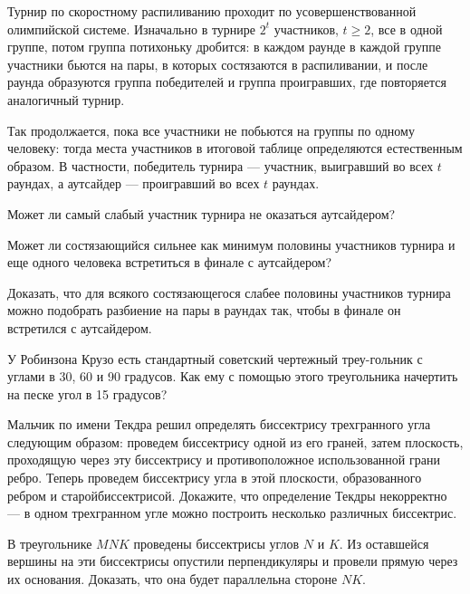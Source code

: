 \noindent Турнир по скоростному распиливанию проходит по усовершенствованной олимпийской системе. Изначально в турнире $2^t$ участников, $t \geq 2$, все в одной группе, потом группа потихоньку дробится: в каждом раунде в каждой группе участники бьются на пары, в которых состязаются в распиливании, и после раунда образуются группа победителей и группа проигравших, где повторяется аналогичный турнир.

\ms Так продолжается, пока все участники не побьются на группы по одному человеку: тогда места участников в итоговой таблице определяются естественным образом. В частности, победитель турнира — участник, выигравший во всех $t$ раундах, а аутсайдер — проигравший во всех $t$ раундах.

\begin{itemize}
\itA Может ли самый слабый участник турнира не оказаться аутсайдером?

\itB Может ли состязающийся сильнее как минимум половины участников турнира и еще одного человека встретиться в финале с аутсайдером?

\itC Доказать, что для всякого состязающегося слабее половины участников турнира можно подобрать разбиение на пары в раундах так, чтобы в финале он встретился с аутсайдером.
\end{itemize}

\begin{itemize}
\itA У Робинзона Крузо есть стандартный советский чертежный треу-\linebreak гольник с углами в 30, 60 и 90 градусов. Как ему с помощью этого треугольника начертить на песке угол в 15 градусов?

\itB Мальчик по имени Текдра решил определять биссектрису трехгранного угла следующим образом: проведем биссектрису одной из его граней, затем плоскость, проходящую через эту биссектрису и противоположное использованной грани ребро. Теперь проведем биссектрису угла в этой плоскости, образованного ребром и старой\linebreak биссектрисой. Докажите, что определение Текдры некорректно — в одном трехгранном угле можно построить несколько различных биссектрис.

\itC В треугольнике $MNK$ проведены биссектрисы углов $N$ и $K$. Из оставшейся вершины на эти биссектрисы опустили перпендикуляры и провели прямую через их основания. Доказать, что она будет параллельна стороне $NK$.
\end{itemize}
